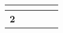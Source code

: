 \documentclass[12pt,a4paper,twoside]{article}
\begin{document}
\begin{longtable}{|>{\centering\arraybackslash}m{10cm}|>{\centering\arraybackslash}m{1.5cm}|>{\centering\arraybackslash}m{1.5cm}|>{\centering\arraybackslash}m{1.5cm}|>{\centering\arraybackslash}m{1.5cm}|}
                            
                                 & \textbf{}
                            

                        
                    
                        
                            

                            
                                 & \textbf{}
                            

                        
                    
                        
                            

                            
                                 & \textbf{}
                            

                        
                    
                        
                            

                            
                                 & \textbf{}
                            

                        
                    
                    \\ \hline
                
                    \cellcolor{gray!20} \textbf{ 2 }
                     
                        
                            

                            
                                 & \textbf{}
                            

                        
                    
                        
                            

                            
                                 & \textbf{}
                            

                        
                    
                        
                            

                            
                                 & \textbf{}
                            


\end{longtable}
\end{document}
